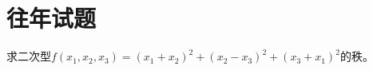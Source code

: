 \section{往年试题}

\begin{frame}
  \begin{li}[05-06上]
    求二次型$f(x_1,x_2,x_3)=(x_1+x_2)^2+(x_2-x_3)^2+(x_3+x_1)^2$的秩。
  \end{li}
\end{frame}